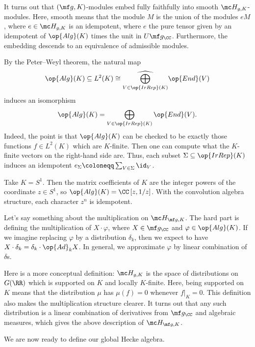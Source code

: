 \documentclass[../notes.tex]{subfiles}
\begin{document}
\begin{remark}
	It turns out that $(\mf g,K)$-modules embed fully faithfully into smooth $\mc H_{g,K}$-modules. Here, smooth means that the module $M$ is the union of the modules $eM$, where $e\in\mc H_{g,K}$ is an idempotent, where $e$ the pure tensor given by an idempotent of $\op{Alg}(K)$ times the unit in $U\mf g_\CC$. Furthermore, the embedding descends to an equivalence of admissible modules.
\end{remark}
\begin{remark}
	By the Peter--Weyl theorem, the natural map
	\[\op{Alg}(K)\subseteq L^2(K)\cong\widehat{\bigoplus_{V\in\op{IrRep}(K)}}\op{End}(V)\]
	induces an isomorphism
	\[\op{Alg}(K)=\bigoplus_{V\in\op{IrRep}(K)}\op{End}(V).\]
	Indeed, the point is that $\op{Alg}(K)$ can be checked to be exactly those functions $f\in L^2(K)$ which are $K$-finite. Then one can compute what the $K$-finite vectors on the right-hand side are. Thus, each subset $\Sigma\subseteq\op{IrRep}(K)$ induces an idempotent $e_\Sigma\coloneqq\sum_{V\in\Sigma}\id_V$.
\end{remark}
\begin{example}
	Take $K=S^1$. Then the matrix coefficients of $K$ are the integer powers of the coordinate $z\in S^1$, so $\op{Alg}(K)=\CC\left[z,1/z\right]$. With the convolution algebra structure, each character $z^n$ is idempotent.
\end{example}
\begin{remark}
	Let's say something about the multiplication on $\mc H_{\mf g,K}$. The hard part is defining the multiplication of $X\cdot\varphi$, where $X\in\mf g_\CC$ and $\varphi\in\op{Alg}(K)$. If we imagine replacing $\varphi$ by a distribution $\delta_k$, then we expect to have $X\cdot\delta_k=\delta_k\cdot\op{Ad}_kX$. In general, we approximate $\varphi$ by linear combination of $\delta$s.
\end{remark}
\begin{remark}
	Here is a more conceptual definition: $\mc H_{g,K}$ is the space of distributions on $G(\RR)$ which is supported on $K$ and locally $K$-finite. Here, being supported on $K$ means that the distribution $\mu$ has $\mu(f)=0$ whenever $f|_K=0$. This definition also makes the multiplication structure clearer. It turns out that any such distribution is a linear combination of derivatives from $\mf g_\CC$ and algebraic measures, which gives the above description of $\mc H_{\mf g,K}$.
\end{remark}
We are now ready to define our global Hecke algebra.
\end{document}
